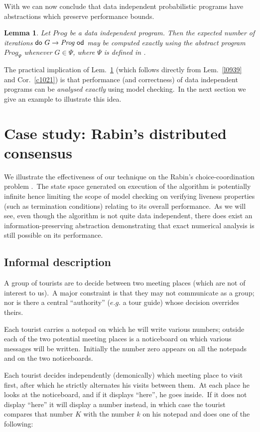\documentclass[numbers,copyright,creativecommons]{eptcs}
\newcommand{\Do}{\mbox{\sf do\ }}
\newcommand{\Od}{\mbox{\sf \ od}}
\newcommand{\Prog}{\textit{Prog}}
\newtheorem{Lems}{Lemma} \newcommand{\Lem}[1]{Lem.~\ref{#1}}
\newcommand{\Cor}[1]{Cor.~\ref{#1}}
\begin{document}
 With  we can now conclude that data independent probabilistic programs have abstractions which preserve performance bounds.

 \begin{Lems}\label{l1111}
 Let $\Prog$ be a data independent program. Then the expected number of iterations $\Do G \rightarrow \Prog  \Od$ may be computed exactly using the abstract program $\Prog_\Psi$ whenever $G \in \Psi$, where $\Psi$ is defined in .
 \end{Lems}

 The practical implication of \Lem{l1111} (which follows directly from \Lem{l0939} and \Cor{c1021}) is that performance (and correctness) of data independent programs can be \emph{analysed exactly} using  model checking.\ In the next section we give an example to illustrate this idea.



\section{Case study: Rabin's distributed consensus}\label{DC}

We illustrate the effectiveness of our technique on
the Rabin's choice-coordination problem \cite{Rabin82}.\ The state space generated on execution of the algorithm is potentially infinite hence limiting the scope of model checking on verifying liveness properties (such as termination conditions) relating to its overall performance.\ As we will see, even though the algorithm is not quite data independent, there does exist an information-preserving abstraction demonstrating that exact numerical analysis is still possible on its performance.

\subsection{Informal description}
A group of tourists are to decide between two meeting places (which are not of
interest to us).\ A major constraint is that they may not communicate as a group; nor
is there a central ``authority'' ($e.g.$ a tour guide) whose decision overrides theirs.

Each tourist carries a notepad on which he will write various numbers; outside each of
the two potential meeting places is a noticeboard on which various messages will
be written.\ Initially the number zero appears on all the notepads and on the two
noticeboards.

Each tourist decides independently (demonically) which meeting place to visit first, after
which he strictly alternates his visits between them.\ At each place he looks at the
noticeboard, and if it displays ``here'', he goes inside.\ If it does not display ``here''
it will display a number instead, in which case the tourist compares that number $K$ with
the number $k$ on his notepad and does one of the following:
\end{document}
